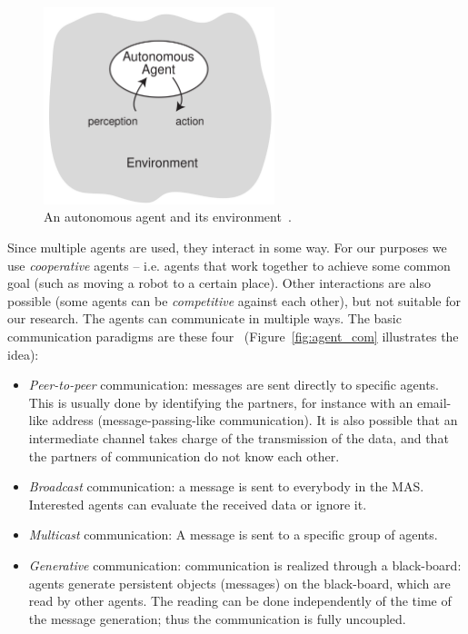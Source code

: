 \begin{figure}
\centering
\includegraphics[width=0.6\textwidth]{Files/Figures/agent.png}
\caption[An autonomous agent and its environment]{An autonomous agent and its environment~\cite{Siekmann1814}.}
\label{fig:agent}
\end{figure}

Since multiple agents are used, they interact in some way. For our purposes we use \textit{cooperative} agents -- i.e. agents that work together to achieve some common goal (such as moving a robot to a certain place). Other interactions are also possible (some agents can be \textit{competitive} against each other), but not suitable for our research. The agents can communicate in multiple ways. The basic communication paradigms are these four~\cite{Siekmann1814} (Figure~\ref{fig:agent_com} illustrates the idea):
\begin{itemize}
\item \textit{Peer-to-peer} communication: messages are sent directly to specific agents. This is usually done by identifying the partners, for instance with an email-like address (message-passing-like communication). It is also possible that an intermediate channel takes charge of the transmission of the data, and that the partners of communication do not know each other.
\item \textit{Broadcast} communication: a message is sent to everybody in the MAS. Interested agents can evaluate the received data or ignore it.
\item \textit{Multicast} communication: A message is sent to a specific group of agents.
\item \textit{Generative} communication: communication is realized through a black-board: agents generate persistent objects (messages) on the black-board, which are read by other agents. The reading can be done independently of the time of the message generation; thus the communication is fully uncoupled.
\end{itemize}

